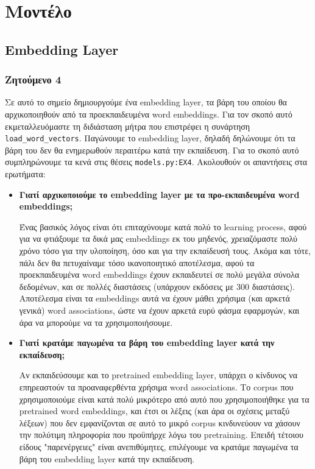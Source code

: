 \documentclass[a4paper, 12pt]{article}
\begin{document}
\section{Μοντέλο}

    \subsection{Embedding Layer}
        \subsubsection*{Ζητούμενο 4}
            Σε αυτό το σημείο δημιουργούμε ένα embedding layer, τα βάρη του οποίου θα αρχικοποιηθούν από τα προεκπαιδευμένα word embeddings. Για τον σκοπό αυτό εκμεταλλευόμαστε τη διδιάσταση μήτρα που επιστρέφει η συνάρτηση \verb|load_word_vectors|. Παγώνουμε το embedding layer, δηλαδή δηλώνουμε ότι τα βάρη του δεν θα ενημερωθούν περαιτέρω κατά την εκπαίδευση. Για το σκοπό αυτό συμπληρώνουμε τα κενά στις θέσεις \verb|models.py:EX4|. Ακολουθούν οι απαντήσεις στα ερωτήματα:
            
            \begin{itemize}
                \item \textbf{Γιατί αρχικοποιούμε το embedding layer με τα προ-εκπαιδευμένα word embeddings;}
                
                    Ένας βασικός λόγος είναι ότι επιταχύνουμε κατά πολύ το learning process, αφού για να φτιάξουμε τα δικά μας embeddings εκ του μηδενός, χρειαζόμαστε πολύ χρόνο τόσο για την υλοποίηση, όσο και για την εκπαίδευσή τους. Ακόμα και τότε, πάλι δεν θα πετυχαίναμε τόσο ικανοποιητικό αποτέλεσμα, αφού τα προεκπαιδευμένα word embeddings έχουν εκπαιδευτεί σε πολύ μεγάλα σύνολα δεδομένων, και σε πολλές διαστάσεις (υπάρχουν εκδόσεις με 300 διαστάσεις). Αποτέλεσμα είναι τα embeddings αυτά να έχουν μάθει χρήσιμα (και αρκετά γενικά) word associations, ώστε να έχουν αρκετά ευρύ φάσμα εφαρμογών, και άρα να μπορούμε να τα χρησιμοποιήσουμε.
                
                \item \textbf{Γιατί κρατάμε παγωμένα τα βάρη του embedding layer κατά την εκπαίδευση;}
                
                    Αν εκπαιδεύσουμε και το pretrained embedding layer, υπάρχει ο κίνδυνος να επηρεαστούν τα προαναφερθέντα χρήσιμα word associations. Το corpus που χρησιμοποιούμε είναι κατά πολύ μικρότερο από αυτό που χρησιμοποιήθηκε για τα pretrained word embeddings, και έτσι οι λέξεις (και άρα οι σχέσεις μεταξύ λέξεων) που δεν εμφανίζονται σε αυτό το μικρό corpus κινδυνεύουν  να χάσουν την πολύτιμη πληροφορία που προϋπήρχε λόγω του pretraining. Επειδή τέτοιου είδους "παρενέργειες" είναι ανεπιθύμητες, επιλέγουμε να κρατάμε παγωμένα τα βάρη του embedding layer κατά την εκπαίδευση.
            \end{itemize}
            
\end{document}
